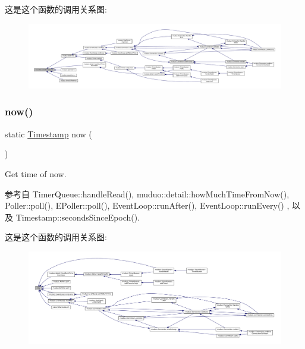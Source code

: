 这是这个函数的调用关系图\+:
\nopagebreak
\begin{figure}[H]
\begin{center}
\leavevmode
\includegraphics[width=350pt]{classmuduo_1_1Timestamp_a8a0616b73c803b94f5c0e9d00fa96fb4_icgraph}
\end{center}
\end{figure}
\mbox{\label{classmuduo_1_1Timestamp_a3bca3b2a36424e36b3d2c772fa7d5772}} 
\subsubsection{\texorpdfstring{now()}{now()}}
{\footnotesize\ttfamily static \hyperlink{classmuduo_1_1Timestamp}{Timestamp} now (\begin{DoxyParamCaption}{ }\end{DoxyParamCaption})\hspace{0.3cm}{\ttfamily [static]}}

Get time of now. 

参考自 Timer\+Queue\+::handle\+Read(), muduo\+::detail\+::how\+Much\+Time\+From\+Now(), Poller\+::poll(), E\+Poller\+::poll(), Event\+Loop\+::run\+After(), Event\+Loop\+::run\+Every() , 以及 Timestamp\+::seconds\+Since\+Epoch().

这是这个函数的调用关系图\+:
\nopagebreak
\begin{figure}[H]
\begin{center}
\leavevmode
\includegraphics[width=350pt]{classmuduo_1_1Timestamp_a3bca3b2a36424e36b3d2c772fa7d5772_icgraph}
\end{center}
\end{figure}
\mbox{\label{classmuduo_1_1Timestamp_a71e46e0dc3ff552a361dfe7dc32847b5}} 
